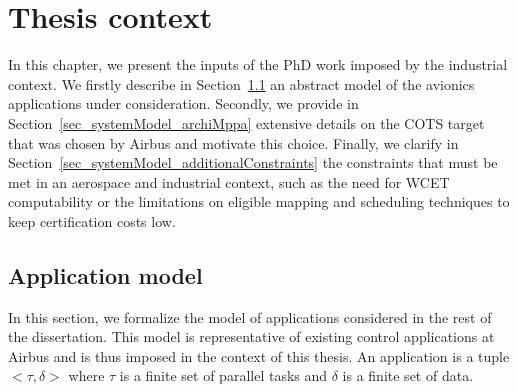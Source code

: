 \documentclass[main.tex]{subfiles}
\begin{document}
\chapter{Thesis context}
\thispagestyle{chapstyle}
\label{chap_systemModel}
\minitoc


In this chapter, we present the inputs of the PhD work imposed by the industrial context. We firstly describe in Section~\ref{sec_systemModel_appModel} an abstract model of the avionics applications under consideration. Secondly, we provide in Section~\ref{sec_systemModel_archiMppa} extensive details on the COTS target that was chosen by Airbus and motivate this choice. Finally, we clarify in Section~\ref{sec_systemModel_additionalConstraints} the constraints that must be met in an aerospace and industrial context, such as the need for WCET computability or the limitations on eligible mapping and scheduling techniques to keep certification costs low.





\section{Application model}
\label{sec_systemModel_appModel}

In this section, we formalize the model of applications considered in the rest of the dissertation. This model is representative of existing control applications at Airbus and is thus imposed in the context of this thesis.
An application is a tuple $< \tau , \delta >$ where $\tau$ is a finite set of parallel tasks and $\delta$ is a finite set of data. 
\end{document}

